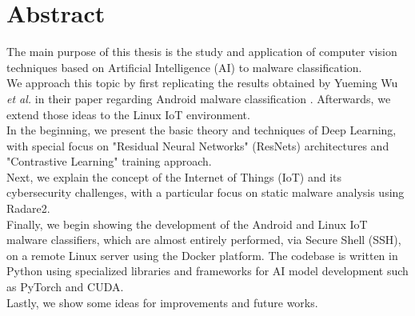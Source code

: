 \chapter*{Abstract}
\thispagestyle{chapterfancy}


The main purpose of this thesis is the study and application of computer vision techniques based on Artificial Intelligence (AI) to malware classification. \\ 
We approach this topic by first replicating the results obtained by Yueming Wu \textit{et al.} in their paper regarding Android malware classification \cite{wu2022contrastive}. Afterwards, we extend those ideas to the Linux IoT environment. \\
In the beginning, we present the basic theory and techniques of Deep Learning, with special focus on "Residual Neural Networks" (ResNets) architectures and "Contrastive Learning" training approach. \\
Next, we explain the concept of the Internet of Things (IoT) and its cybersecurity challenges, with a particular focus on static malware analysis using Radare2. \\
Finally, we begin showing the development of the Android and Linux IoT malware classifiers, which are almost entirely performed, via Secure Shell (SSH), on a remote Linux server using the Docker platform. The codebase is written in Python using specialized libraries and frameworks for AI model development such as PyTorch and CUDA. \\
Lastly, we show some ideas for improvements and future works. 